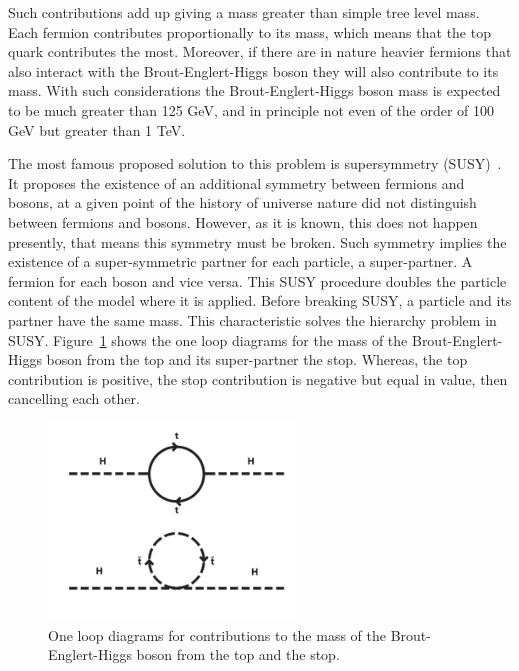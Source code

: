 Such contributions add up giving a mass greater than simple tree level mass. Each fermion contributes proportionally to its mass, which means that the top quark contributes the most. Moreover, if there are in nature heavier fermions that also interact with the Brout-Englert-Higgs boson they will also contribute to its mass. With such considerations the Brout-Englert-Higgs boson mass is expected to be much greater than 125 GeV, and in principle not even of the order of 100 GeV but greater than 1 TeV. %

The most famous proposed solution to this problem is supersymmetry (SUSY)~\cite{Fayet:1977yc,Martin:1997ns}. It proposes the existence of an additional symmetry between fermions and bosons, at a given point of the history of universe nature did not distinguish between fermions and bosons. However, as it is known, this does not happen presently, that means this symmetry must be broken. Such symmetry implies the existence of a super-symmetric partner for each particle, a super-partner. A fermion for each boson and vice versa. This SUSY procedure doubles the particle content of the model where it is applied. Before breaking SUSY, a particle and its partner have the same mass. This characteristic solves the hierarchy problem in SUSY. Figure~\ref{fig:susy} shows the one loop diagrams for the mass of the Brout-Englert-Higgs boson from the top and its super-partner the stop. Whereas, the top contribution is positive, the stop contribution is negative but equal in value, then cancelling each other.

\begin{figure}[!Hhtbp]
  \begin{center}
    \includegraphics[width=0.6\textwidth]{figs/SUSY.png}
    \caption{One loop diagrams for contributions to the mass of the Brout-Englert-Higgs boson from the top and the stop.}
    \label{fig:susy}
  \end{center}
\end{figure}

